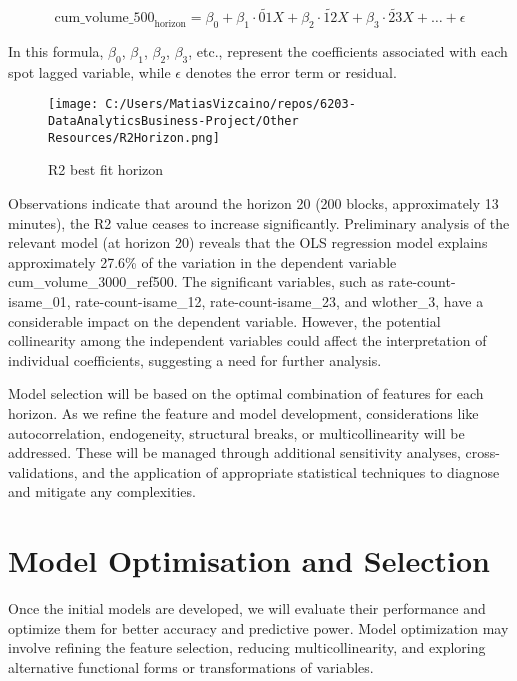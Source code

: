\documentclass{article}
\begin{document}
\[
\text{{cum\_volume\_500}}_\text{{horizon}} = \beta_0 + \beta_1 \cdot \widetilde{01}X + \beta_2 \cdot \widetilde{12}X + \beta_3 \cdot \widetilde{23}X + \ldots + \epsilon
\]

In this formula, \(\beta_0\), \(\beta_1\), \(\beta_2\), \(\beta_3\), etc., represent the coefficients associated with each spot lagged variable, while \(\epsilon\) denotes the error term or residual.

\begin{wrapfigure}[16]{l}{0.35\textwidth}
\vspace{0pt} %
\centering
\texttt{[image: C:/Users/MatiasVizcaino/repos/6203-DataAnalyticsBusiness-Project/Other Resources/R2Horizon.png]}
\caption{R2 best fit horizon}
\label{fig:R2-horizon}
\end{wrapfigure}

Observations indicate that around the horizon 20 (200 blocks, approximately 13 minutes), the R2 value ceases to increase significantly. Preliminary analysis of the relevant model (at horizon 20) reveals that the OLS regression model explains approximately 27.6\% of the variation in the dependent variable cum\_volume\_3000\_ref500. The significant variables, such as rate-count-isame\_01, rate-count-isame\_12, rate-count-isame\_23, and wlother\_3, have a considerable impact on the dependent variable. However, the potential collinearity among the independent variables could affect the interpretation of individual coefficients, suggesting a need for further analysis.

Model selection will be based on the optimal combination of features for each horizon. As we refine the feature and model development, considerations like autocorrelation, endogeneity, structural breaks, or multicollinearity will be addressed. These will be managed through additional sensitivity analyses, cross-validations, and the application of appropriate statistical techniques to diagnose and mitigate any complexities.


\section*{\textbf{Model Optimisation and Selection}}

Once the initial models are developed, we will evaluate their performance and optimize them for better accuracy and predictive power. Model optimization may involve refining the feature selection, reducing multicollinearity, and exploring alternative functional forms or transformations of variables.
\end{document}
